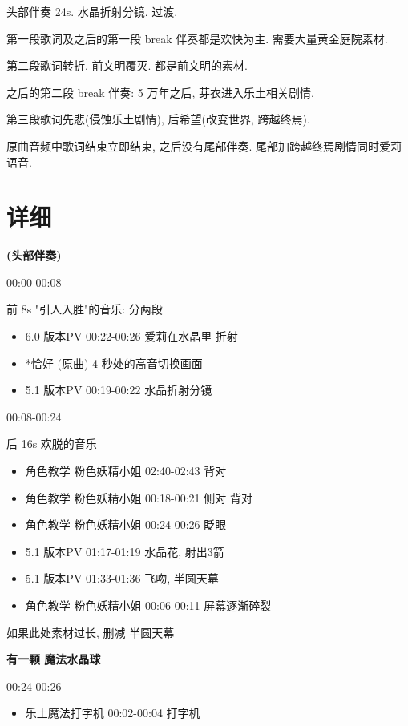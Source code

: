 \documentclass[a4paper]{article}
\begin{document}
头部伴奏 24s. 水晶折射分镜. 过渡.

第一段歌词及之后的第一段 break 伴奏都是欢快为主. 需要大量黄金庭院素材.

第二段歌词转折. 前文明覆灭. 都是前文明的素材.

之后的第二段 break 伴奏: 5 万年之后, 芽衣进入乐土相关剧情.

第三段歌词先悲(侵蚀乐土剧情), 后希望(改变世界, 跨越终焉).

原曲音频中歌词结束立即结束, 之后没有尾部伴奏. 尾部加跨越终焉剧情同时爱莉语音.

\section{详细}

\textbf{(头部伴奏)}

00:00-00:08

前 8s "引人入胜"的音乐: 分两段

\begin{itemize}
    \item 6.0 版本PV 00:22-00:26 爱莉在水晶里 折射
    \item *恰好 (原曲) 4 秒处的高音切换画面
    \item 5.1 版本PV 00:19-00:22 水晶折射分镜
\end{itemize}

00:08-00:24

后 16s 欢脱的音乐

\begin{itemize}
    \item 角色教学 粉色妖精小姐 02:40-02:43 背对
    \item 角色教学 粉色妖精小姐 00:18-00:21 侧对 背对
    \item 角色教学 粉色妖精小姐 00:24-00:26 眨眼
    \item 5.1 版本PV 01:17-01:19 水晶花, 射出3箭
    \item 5.1 版本PV 01:33-01:36 飞吻, 半圆天幕
    \item 角色教学 粉色妖精小姐 00:06-00:11 屏幕逐渐碎裂
\end{itemize}

如果此处素材过长, 删减 半圆天幕

\textbf{有一颗 魔法水晶球}

00:24-00:26

\begin{itemize}
    \item 乐土魔法打字机 00:02-00:04 打字机
\end{itemize}
\end{document}
